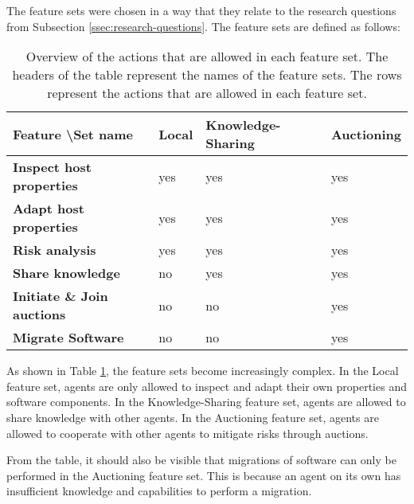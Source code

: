 The feature sets were chosen in a way that they relate to the research questions from Subsection \ref{ssec:research-questions}. The feature sets are defined as follows:

\begin{table}[H]
        \centering
        \begin{tabular}{l|l|l|l}
            \textbf{Feature \textbackslash Set name} & \textbf{Local} & \textbf{Knowledge-Sharing} & \textbf{Auctioning} \\ \hline
            \textbf{Inspect host properties}     & yes            & yes                        & yes                 \\
            \textbf{Adapt host properties}       & yes            & yes                        & yes                 \\
            \textbf{Risk analysis}               & yes            & yes                        & yes                 \\
            \textbf{Share knowledge}             & no             & yes                        & yes                 \\
            \textbf{Initiate \& Join auctions}   & no             & no                         & yes                 \\
            \textbf{Migrate Software}            & no             & no                         & yes                            
        \end{tabular}
        \caption{\label{table:experiment-features}Overview of the actions that are allowed in each feature set. The headers of the table represent the names of the feature sets. The rows represent the actions that are allowed in each feature set.}
\end{table}

As shown in Table \ref{table:experiment-features}, the feature sets become increasingly complex. In the Local feature set, agents are only allowed to inspect and adapt their own properties and software components. In the Knowledge-Sharing feature set, agents are allowed to share knowledge with other agents. In the Auctioning feature set, agents are allowed to cooperate with other agents to mitigate risks through auctions.

From the table, it should also be visible that migrations of software can only be performed in the Auctioning feature set. This is because an agent on its own has insufficient knowledge and capabilities to perform a migration.

